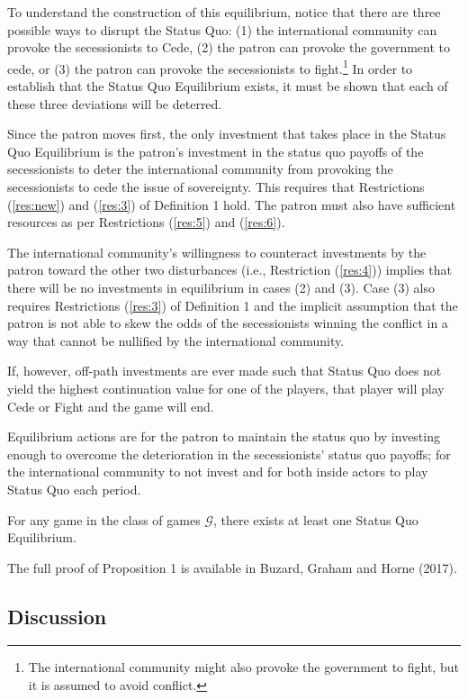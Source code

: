 To understand the construction of this equilibrium, notice that there are three possible ways to disrupt the Status Quo: (1) the international community can provoke the secessionists to Cede, (2) the patron can provoke the government to cede, or (3) the patron can provoke the secessionists to fight.\footnote{The international community might also provoke the government to fight, but it is assumed to avoid conflict.} In order to establish that the Status Quo Equilibrium exists, it must be shown that each of these three deviations will be deterred.

Since the patron moves first, the only investment that takes place in the Status Quo Equilibrium is the patron's investment in the status quo payoffs of the secessionists to deter the international community from provoking the secessionists to cede the issue of sovereignty. This requires that Restrictions (\ref{res:new}) and (\ref{res:3}) of Definition 1 hold. The patron must also have sufficient resources as per Restrictions (\ref{res:5}) and (\ref{res:6}).

The international community's willingness to counteract investments by the patron toward the other two disturbances (i.e., Restriction (\ref{res:4})) implies that there will be no investments in equilibrium in cases (2) and (3). Case (3) also requires Restrictions (\ref{res:3}) of Definition 1 and the implicit assumption that the patron is not able to skew the odds of the secessionists winning the conflict in a way that cannot be nullified by the international community. 

If, however, off-path investments are ever made such that Status Quo does not yield the highest continuation value for one of the players, that player will play Cede or Fight and the game will end.

Equilibrium actions are for the patron to maintain the status quo by investing enough to overcome the deterioration in the secessionists' status quo payoffs; for the international community to not invest and for both inside actors to play Status Quo each period.

\begin{proposition}
	For any game in the class of games $\mathcal{G}$, there exists at least one Status Quo Equilibrium.
\end{proposition}

The full proof of Proposition 1 is available in Buzard, Graham and Horne (2017).


\subsection{Discussion}

